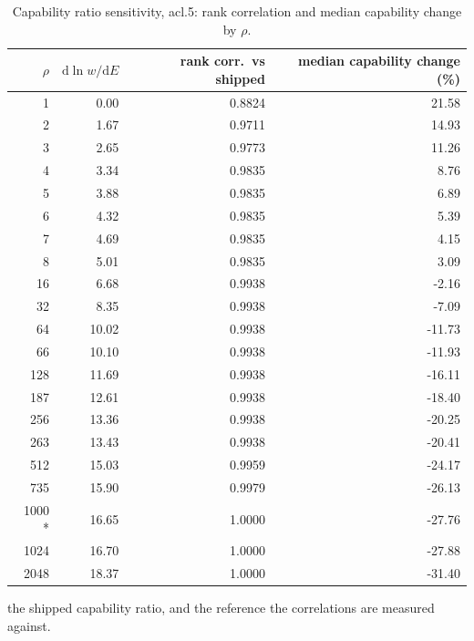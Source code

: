 \begin{table}[htbp]
  \centering
  \caption{Capability ratio sensitivity, acl.5: rank correlation and median capability change by $\rho$.}
  \label{tab:rho-acl-5-summary}
  \begin{tabular}{r r r r}
    \toprule
    $\rho$ & $\mathrm{d}\ln w/\mathrm{d}E$ & rank corr.\ vs shipped & median capability change (\%) \\
    \midrule
    1 & 0.00 & 0.8824 & 21.58 \\
    2 & 1.67 & 0.9711 & 14.93 \\
    3 & 2.65 & 0.9773 & 11.26 \\
    4 & 3.34 & 0.9835 & 8.76 \\
    5 & 3.88 & 0.9835 & 6.89 \\
    6 & 4.32 & 0.9835 & 5.39 \\
    7 & 4.69 & 0.9835 & 4.15 \\
    8 & 5.01 & 0.9835 & 3.09 \\
    16 & 6.68 & 0.9938 & -2.16 \\
    32 & 8.35 & 0.9938 & -7.09 \\
    64 & 10.02 & 0.9938 & -11.73 \\
    66 & 10.10 & 0.9938 & -11.93 \\
    128 & 11.69 & 0.9938 & -16.11 \\
    187 & 12.61 & 0.9938 & -18.40 \\
    256 & 13.36 & 0.9938 & -20.25 \\
    263 & 13.43 & 0.9938 & -20.41 \\
    512 & 15.03 & 0.9959 & -24.17 \\
    735 & 15.90 & 0.9979 & -26.13 \\
    1000 * & 16.65 & 1.0000 & -27.76 \\
    1024 & 16.70 & 1.0000 & -27.88 \\
    2048 & 18.37 & 1.0000 & -31.40 \\
    \bottomrule
  \end{tabular}
  \par\smallskip\footnotesize * the shipped capability ratio, and the reference the correlations are measured against.
\end{table}
